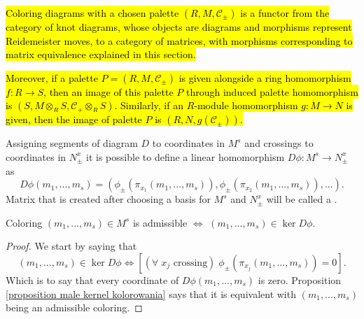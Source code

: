 \hl{Coloring diagrams with a chosen palette $(R, M, \mathcal{C}_\pm)$ is a functor from the category of knot diagrams, whose objects are diagrams and morphisms represent Reidemeister moves, to a category of matrices, with morphisms corresponding to matrix equivalence explained in this section.}

\hl{Moreover, if a palette $P=(R, M, \mathcal{C}_\pm)$ is given alongside a ring homomorphism $f:R\to S$, then an image of this palette $P$ through induced palette homomorphism is $(S, M\otimes_R S, \mathcal{C}_\pm\otimes_R S)$. Similarly, if an $R$-module homomorphism $g:M\to N$ is given, then the image of palette $P$ is $(R, N, g(\mathcal{C}_\pm))$.}

\begin{definition}\label{def:color checking matrix}
  Assigning segments of diagram $D$ to coordinates in $M^s$ and crossings to coordinates in $N_\pm^x$ it is possible to define a linear homomorphism $D\phi:M^s\to N_\pm^x$  as
  $$D\phi(m_1,...,m_s)=(\phi_\pm(\pi_{x_1}(m_1,...,m_s)), \phi_\pm(\pi_{x_2}(m_1,...,m_s)),...).$$
  Matrix that is created after choosing a basis for $M^s$ and $N_\pm^x$ will be called a .
\end{definition}

\begin{proposition}
  Coloring $(m_1,...,m_s)\in M^s$ is admissible $\iff$ $(m_1,...,m_s)\in\ker D\phi$.
\end{proposition}

\begin{proof}
  We start by saying that 
  $$(m_1,..., m_s)\in\ker D\phi\iff [(\forall\;x_j\text{ crossing})\;\phi_\pm(\pi_{x_j}(m_1,..., m_s))=0].$$
  Which is to say that every coordinate of $D\phi(m_1,..., m_s)$ is zero. Proposition \cref{proposition male kernel kolorowania} says that it is equivalent with $(m_1,..., m_s)$ being an admissible coloring.
\end{proof}

